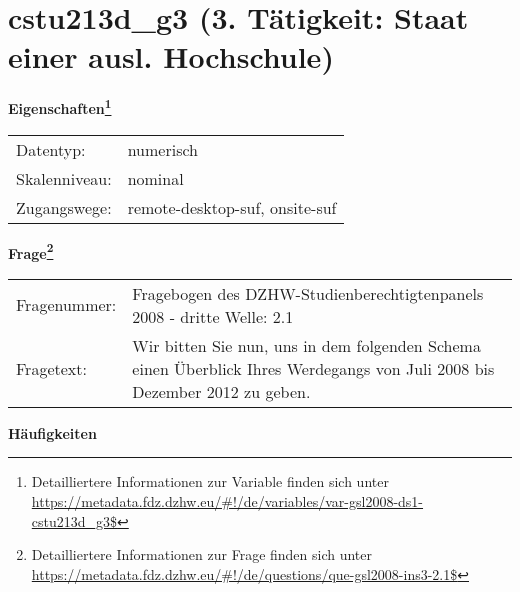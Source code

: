 
    \setcounter{footnote}{0}

    \vspace*{-1.8cm}
	\section{cstu213d\_g3 (3. Tätigkeit: Staat einer ausl. Hochschule)}
	\label{section:cstu213d_g3}



    \vspace*{0.5cm}
    \noindent\textbf{Eigenschaften\footnote{Detailliertere Informationen zur Variable finden sich unter
		\url{https://metadata.fdz.dzhw.eu/\#!/de/variables/var-gsl2008-ds1-cstu213d_g3$}}}\\
	\begin{tabularx}{\hsize}{@{}lX}
	Datentyp: & numerisch \\
	Skalenniveau: & nominal \\
	Zugangswege: &
	  remote-desktop-suf, 
	  onsite-suf
 \\
    \end{tabularx}



				\vspace*{0.5cm}
                \noindent\textbf{Frage\footnote{Detailliertere Informationen zur Frage finden sich unter
		              \url{https://metadata.fdz.dzhw.eu/\#!/de/questions/que-gsl2008-ins3-2.1$}}}\\
				\begin{tabularx}{\hsize}{@{}lX}
					Fragenummer: &
					  Fragebogen des DZHW-Studienberechtigtenpanels 2008 - dritte Welle:
					  2.1
 \\
					Fragetext: & Wir bitten Sie nun, uns in dem folgenden Schema einen Überblick Ihres Werdegangs von Juli 2008 bis Dezember 2012 zu geben. \\
				\end{tabularx}





        		\vspace*{0.5cm}
                \noindent\textbf{Häufigkeiten}

